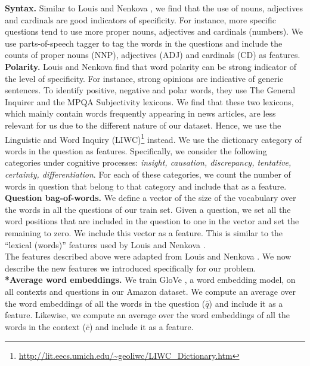 \documentclass[11pt,a4paper]{article}
\begin{document}
\noindent \textbf{Syntax.} Similar to Louis and Nenkova \cite{louis2011automatic}, we find that the use of nouns, adjectives and cardinals are good indicators of specificity. For instance, more specific questions tend to use more proper nouns, adjectives and cardinals (numbers). We use parts-of-speech tagger to tag the words in the questions and include the counts of proper nouns (NNP), adjectives (ADJ) and cardinals (CD) as features. \\

\noindent \textbf{Polarity.} Louis and Nenkova \cite{louis2011automatic} find that word polarity can be strong indicator of the level of specificity. For instance, strong opinions are indicative of generic sentences. To identify positive, negative and polar words, they use The General Inquirer and the MPQA Subjectivity lexicons. 
We find that these two lexicons, which mainly contain words frequently appearing in news articles,  are less relevant for us due to the different nature of our dataset. 
Hence, we use the Linguistic and Word Inquiry (LIWC)\footnote{\url{http://lit.eecs.umich.edu/~geoliwc/LIWC_Dictionary.htm}} \cite{pennebaker2001linguistic} instead. We use the dictionary category of words in the question as features. Specifically, we consider the following categories under cognitive processes: \textit{insight, causation, discrepancy, tentative, certainty, differentiation}. For each of these categories, we count the number of words in question that belong to that category and include that as a feature. \\

\noindent \textbf{Question bag-of-words.} We define a vector of the size of the vocabulary over the words in all the questions of our train set. Given a question, we set all the word positions that are included in the question to one in the vector and set the remaining to zero. We include this vector as a feature. This is similar to the ``lexical (words)'' features used by Louis and Nenkova \cite{louis2011automatic}. \\

The features described above were adapted from Louis and Nenkova \cite{louis2011automatic}. We now describe the new features we introduced specifically for our problem. \\

\noindent \textbf{*Average word embeddings.} We train GloVe \cite{pennington2014glove}, a word embedding model, on all contexts and questions in our Amazon dataset. We compute an average over the word embeddings of all the words in the question ($\bar{q}$) and include it as a feature. Likewise, we compute an average over the word embeddings of all the words in the context ($\bar{c}$) and include it as a feature.\\
\end{document}
